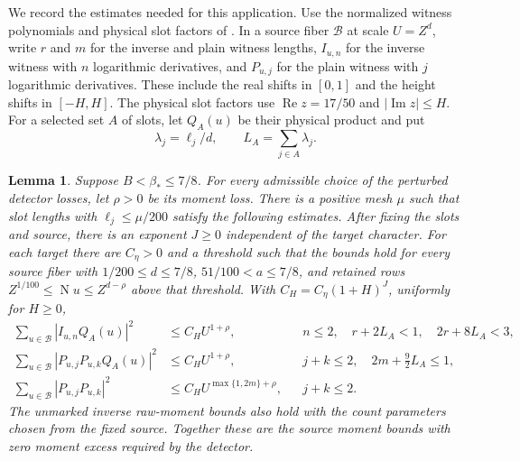 \documentclass[11pt]{article}
\newtheorem{lemma}[theorem]{Lemma}
\newcommand{\Ree}{\operatorname{Re}}
\newcommand{\NF}{\operatorname{N}}
\begin{document}
We record the estimates needed for this application. Use the normalized
witness polynomials and physical slot factors of \cite{OAI}. In a source
fiber $\mathcal B$ at scale $U=Z^d$, write $r$ and $m$ for the inverse and
plain witness lengths, $I_{u,n}$ for the inverse witness with $n$
logarithmic derivatives, and $P_{u,j}$ for the plain witness with $j$
logarithmic derivatives. These include the real shifts in $[0,1]$ and
the height shifts in $[-H,H]$. The physical slot factors use
$\Ree z=17/50$ and $|\operatorname{Im}z|\le H$.
For a selected set $A$ of slots, let
$Q_A(u)$ be their physical product and put
\[
 \lambda_j=\ell_j/d,\qquad L_A=\sum_{j\in A}\lambda_j.
\]

\begin{lemma}\label{lem:moments}
Suppose $B<\beta_*\le7/8$. For every admissible choice of the perturbed
detector losses, let $\rho>0$ be its moment loss. There is a positive mesh
$\mu$ such that slot lengths with $\ell_j\le\mu/200$ satisfy the following
estimates. After fixing the slots and source, there is an exponent
$J\ge0$ independent of the target character. For each target there are
$C_\eta>0$ and a threshold such that the bounds hold for every source fiber with
$1/200\le d\le7/8$, $51/100<a\le7/8$, and retained rows
$Z^{1/100}\le\NF u\le Z^{d-\rho}$ above that threshold.
With $C_H=C_\eta(1+H)^J$, uniformly for $H\ge0$,
\begin{align}
 \sum_{u\in\mathcal B}|I_{u,n}Q_A(u)|^2
   &\le C_H U^{1+\rho},
   && n\le2,\quad r+2L_A<1,\quad 2r+8L_A<3,
   \label{eq:inverse-moment}\\
 \sum_{u\in\mathcal B}|P_{u,j}P_{u,k}Q_A(u)|^2
   &\le C_H U^{1+\rho},
   && j+k\le2,\quad 2m+\tfrac92 L_A\le1,
   \label{eq:plain-marked-moment}\\
 \sum_{u\in\mathcal B}|P_{u,j}P_{u,k}|^2
   &\le C_H U^{\max\{1,2m\}+\rho},
   && j+k\le2.
   \label{eq:plain-unmarked-moment}
\end{align}
The unmarked inverse raw-moment bounds also hold with the count parameters
chosen from the fixed source. Together these are the source moment bounds
with zero moment excess required by the detector.
\end{lemma}
\end{document}

